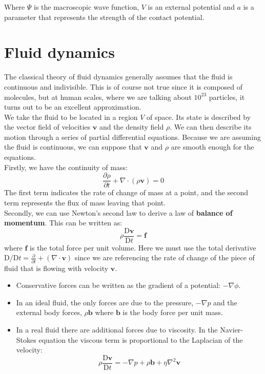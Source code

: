 \documentclass{article}
\begin{document}
Where $\Psi$ is the macroscopic wave function, $V$ is an external potential and $a$ is a parameter that represents the strength of the contact potential.

\section{Fluid dynamics}
The classical theory of fluid dynamics generally assumes that the fluid is
continuous and indivisible.  This is of course not true since it is composed
of molecules, but at human scales, where we are talking about $10^{23}$
particles, it turns out to be an excellent approximation.
\\

We take the fluid to be located in a region $V$ of space.  Its state is
described by the vector field of velocities $\mathbf{v}$ and the density
field $\rho$.  We can then describe its motion through a series of partial
differential equations.  Because we are assuming the fluid is continuous, we
can suppose that $\mathbf{v}$ and $\rho$ are smooth enough for the equations.
\\

Firstly, we have the continuity of mass:
\[\frac{\partial\rho}{\partial t} + \nabla\cdot(\rho\mathbf{v}) = 0\]
The first term indicates the rate of change of mass at a point, and the second
term represents the flux of mass leaving that point.
\\

Secondly, we can use Newton's second law to derive a law of
\textbf{balance of momentum}.	This can be written as:
\[\rho\frac{\mathrm{D}\mathbf{v}}{\mathrm{D} t}= \mathbf{f}\]
where $\mathbf{f}$ is the total force per unit volume.	Here we must use the
total derivative
$\mathrm{D}/\mathrm{D}t = \frac{\partial}{\partial t} + (\nabla \cdot
    \mathbf{v})$
since we are referencing the rate of change of the piece of fluid that is
flowing with velocity $\mathbf{v}$.
\begin{itemize}
    \item Conservative forces can be written as the gradient of a potential: $-\nabla\phi$.
    \item In an ideal fluid, the only forces are due to the pressure, $-\nabla p$ and the external body forces, $\rho \mathbf{b}$ where $\mathbf{b}$ is the body force per unit mass.
    \item In a real fluid there are additional forces due to viscosity. In the Navier-Stokes equation the viscous term is proportional to the Laplacian of the velocity:
\[\rho\frac{\mathrm{D}\mathbf{v}}{\mathrm{D} t}=-\nabla p + \rho \mathbf{b} +
    \eta\nabla^2{\mathbf{v}}\]
\end{itemize}
\end{document}
